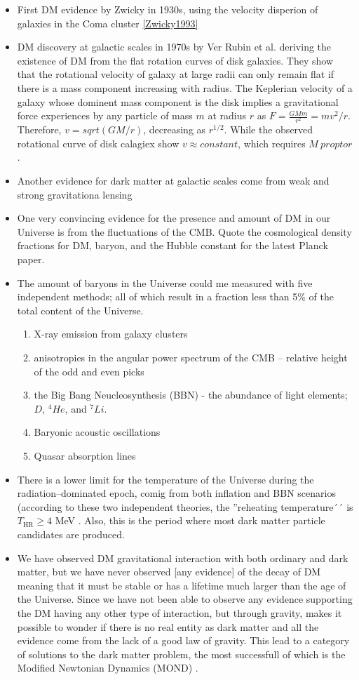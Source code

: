 \documentclass[paper=a4, fontsize=11pt]{scrartcl} %
\numberwithin{equation}{section} %
\numberwithin{figure}{section} %
\numberwithin{table}{section} %
\begin{document}
\begin{itemize}
\item First DM evidence by Zwicky in 1930s, using the velocity disperion of galaxies in the Coma cluster \ref{Zwicky1993}
\item DM discovery at galactic scales in 1970s by Ver Rubin et al. deriving the existence of DM from the flat rotation curves of disk galaxies. They show that the rotational velocity of galaxy at large radii can only remain flat if there is a mass component increasing with radius. The Keplerian velocity of a galaxy whose dominent mass component is the disk implies a gravitational force experiences by any particle of mass $m$ at radius $r$ as $F = \frac{G M m}{r^2} = m v^2/r$. Therefore, $v = sqrt(GM/r)$, decreasing as $r^{1/2}$. While the observed rotational curve of disk calagiex show $v \approx constant$, which requires $M \ propto r$.
\item Another evidence for dark matter at galactic scales come from weak and strong gravitationa lensing
\item One very convincing evidence for the presence and amount of DM in our Universe is from the fluctuations of the CMB. Quote the cosmological density fractions for DM, baryon, and the Hubble constant for the latest Planck paper.
\item The amount of baryons in the Universe could me measured with five independent methods; all of which result in a fraction less than 5\% of the total content of the Universe.
\begin{enumerate}
\item X-ray emission from galaxy clusters
\item anisotropies in the angular power spectrum of the CMB -- relative height of the odd and even picks
\item the Big Bang Neucleosynthesis (BBN) - the abundance of light elements; $D$, $^4He$, and $^7Li$.
\item Baryonic acoustic oscillations
\item Quasar absorption lines
\end{enumerate}
\item There is a lower limit for the temperature of the Universe during the radiation--dominated epoch, comig from both inflation and BBN scenarios (according to these two independent theories, the ''reheating temperature´´ is $T_\mathrm{HR} \geq 4$ MeV \citep[ref. 10 in lecturenotes!][]{}. Also, this is the period where most dark matter particle candidates are produced.
\item We have observed DM gravitational interaction with both ordinary and dark matter, but we have never observed [any evidence] of the decay of DM meaning that it must be stable or has a lifetime much larger than the age of the Universe. Since we have not been able to observe any evidence supporting the DM having any other type of interaction, but through gravity, makes it possible to wonder if there is no real entity as dark matter and all the evidence come from the lack of a good law of gravity. This lead to a category of solutions to the dark matter problem, the most successfull of which is the Modified Newtonian Dynamics (MOND) \citep[ref. 14 \& 15 in lecturenotes!][]{}.

\end{itemize}
\end{document}
